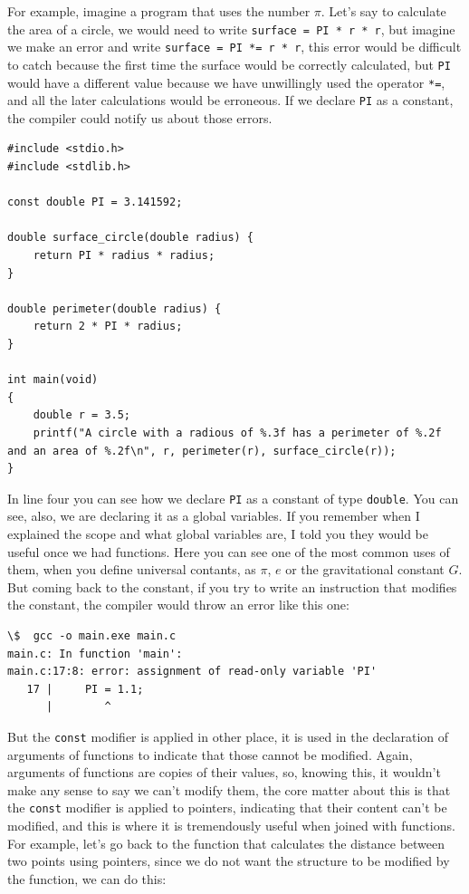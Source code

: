 \documentclass[a4paper]{article}
\begin{document}
For example, imagine a program that uses the number $\pi$. Let's say to
calculate the area of a circle, we would need to write
\verb!surface = PI * r * r!, but imagine we make an error and write
\verb!surface = PI *= r * r!, this error would be difficult to catch because
the first time the surface would be correctly calculated, but \verb!PI! would
have a different value because we have unwillingly used the operator \verb!*=!,
and all the later calculations would be erroneous. If we declare \verb!PI! as
a constant, the compiler could notify us about those errors.
\noindent
\begin{minipage}[H]{\linewidth}
\mbox{}
\begin{lstlisting}[style=C,
caption={Uso de una constante numérica},
label={lst:constantUsage}]
#include <stdio.h>
#include <stdlib.h>

const double PI = 3.141592;

double surface_circle(double radius) {
    return PI * radius * radius;
}

double perimeter(double radius) {
    return 2 * PI * radius;
}

int main(void)
{
    double r = 3.5;
    printf("A circle with a radious of %.3f has a perimeter of %.2f and an area of %.2f\n", r, perimeter(r), surface_circle(r));
}
\end{lstlisting}
\end{minipage}

In line four you can see how we declare \verb!PI! as a constant of type
\verb!double!. You can see, also, we are declaring it as a global variables. If
you remember when I explained the scope and what global variables are, I told
you they would be useful once we had functions. Here you can see one of the most
common uses of them, when you define universal contants, as $\pi$, $e$ or the
gravitational constant $G$. But coming back to the constant, if you try to write
an instruction that modifies the constant, the compiler would throw an error
like this one:
\noindent
\begin{minipage}[H]{\linewidth}
\mbox{}
\begin{lstlisting}[style=terminalStyle]
\$  gcc -o main.exe main.c
main.c: In function 'main':
main.c:17:8: error: assignment of read-only variable 'PI'
   17 |     PI = 1.1;
      |        ^
\end{lstlisting}
\end{minipage}

But the \verb!const! modifier is applied in other place, it is used in the
declaration of arguments of functions to indicate that those cannot be modified.
Again, arguments of functions are copies of their values, so, knowing this,
it wouldn't make any sense to say we can't modify them, the core matter about
this is that the \verb"const" modifier is applied to pointers, indicating that
their content can't be modified, and this is where it is tremendously useful
when joined with functions. For example, let's go back to the function that
calculates the distance between two points using pointers, since we do not want
the structure to be modified by the function, we can do this:
\end{document}
